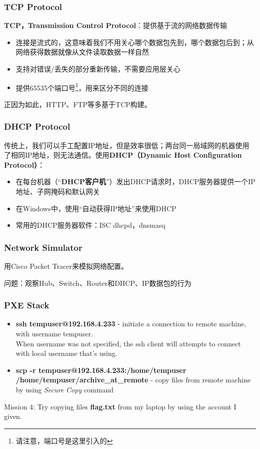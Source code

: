 \documentclass[11pt]{beamer}
\begin{document}
\begin{frame}
\frametitle{TCP Protocol}
\textbf{TCP，Transmission Control Protocol}：提供基于流的网络数据传输
\begin{itemize}
\item 连接是流式的，这意味着我们不用关心哪个数据包先到，哪个数据包后到；从网络获得数据就像从文件读取数据一样自然
\item 支持对错误/丢失的部分重新传输，不需要应用层关心
\item 提供65535个端口号\footnote{请注意，端口号是这里引入的}，用来区分不同的连接
\end{itemize}
正因为如此，HTTP、FTP等多基于TCP构建。
\end{frame}

\begin{frame}
\frametitle{DHCP Protocol}
传统上，我们可以手工配置IP地址，但是效率很低；两台同一局域网的机器使用了相同IP地址，则无法通信。使用\textbf{DHCP（Dynamic Host Configuration Protocol）}：
\begin{itemize}
\item 在每台机器（“\textbf{DHCP客户机}”）发出DHCP请求时，DHCP服务器提供一个IP地址、子网掩码和默认网关
\item 在Windows中，使用“自动获得IP地址”来使用DHCP
\item 常用的DHCP服务器软件：ISC dhcpd，dnsmasq
\end{itemize}

\end{frame}

\begin{frame}
\frametitle{Network Simulator}
用Cisco Packet Tracer来模拟网络配置。

问题：观察Hub、Switch、Router和DHCP、IP数据包的行为

\end{frame}


\begin{frame}
\frametitle{PXE Stack}

\begin{itemize}
\item \textbf{ssh tempuser@192.168.4.233} - initiate a connection to remote machine, with username tempuser.\\
When username was not specified, the ssh client will attempts to connect with local username that's using.
\item \textbf{scp -r tempuser@192.168.4.233:/home/tempuser /home/tempuser/archive\_at\_remote} - copy files from remote machine by using \textit{Secure Copy} command
\end{itemize}

Mission 4: Try copying files \textbf{flag.txt} from my laptop by using the account I given.
\end{frame}
\end{document}
